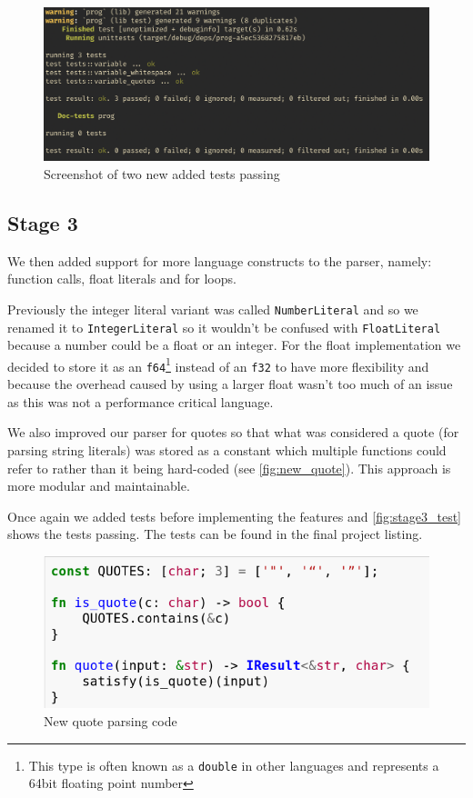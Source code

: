 \documentclass{article}
\begin{document}
\begin{figure}
	\includegraphics[width=\textwidth]{stage2_test}
	\caption{Screenshot of two new added tests passing}
	\label{fig:stage2_test}
\end{figure}

\subsection{Stage 3}

We then added support for more language constructs to the parser, namely:
function calls, float literals and for loops.

Previously the integer literal variant was called \texttt{NumberLiteral} and so
we renamed it to \texttt{IntegerLiteral} so it wouldn't be confused with
\texttt{FloatLiteral} because a number could be a float or an integer. For the
float implementation we decided to store it as an \texttt{f64}\footnote{This
type is often known as a \texttt{double} in other languages and represents a
64bit floating point number} instead of an \texttt{f32} to have more
flexibility and because the overhead caused by using a larger float wasn't too
much of an issue as this was not a performance critical language.

We also improved our parser for quotes so that what was considered a quote (for
parsing string literals) was stored as a constant which multiple functions
could refer to rather than it being hard-coded (see \autoref{fig:new_quote}).
This approach is more modular and maintainable.

Once again we added tests before implementing the features and
\autoref{fig:stage3_test} shows the tests passing. The tests can be found in
the final project listing.

\begin{figure}
	\includegraphics[width=\textwidth]{new_quote}
	\caption{New quote parsing code}
	\label{fig:new_quote}
\end{figure}
\end{document}
